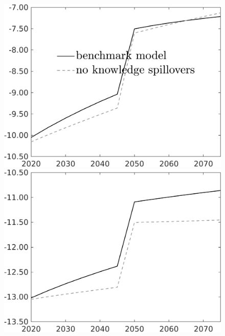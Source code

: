 \begin{figure}[h!!]
\begin{minipage}[]{0.32\textwidth}
		\includegraphics[width=1\textwidth]{../../codding_model/own_basedOnFried/optimalPol_010922_revision/figures/all_13Sept22/CompTaufPER_bytaul_KN_Reg0_Tauf_spillover0_nsk0_xgr0_knspil0_sep0_LFlimit1_emsbase0_countec0_GovRev0_etaa0.79_lgd1.png} 
	\end{minipage}	
	\begin{minipage}[]{0.32\textwidth}
		\includegraphics[width=1\textwidth]{../../codding_model/own_basedOnFried/optimalPol_010922_revision/figures/all_13Sept22/CompTaufPER_bytaul_KN_Reg0_GFF_spillover0_nsk0_xgr0_knspil0_sep0_LFlimit1_emsbase0_countec0_GovRev0_etaa0.79_lgd0.png}
	 \end{minipage}	

\end{figure}
